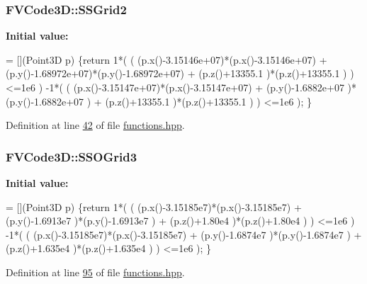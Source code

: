 \subsubsection[{\texorpdfstring{S\+S\+Grid2}{SSGrid2}}]{ F\+V\+Code3\+D\+::\+S\+S\+Grid2}\hypertarget{namespaceFVCode3D_a4072861e3dbbfcd9e80417b32c6991be}{}\label{namespaceFVCode3D_a4072861e3dbbfcd9e80417b32c6991be}
{\bfseries Initial value\+:}
\begin{DoxyCode}
= [](Point3D p)
    \{\textcolor{keywordflow}{return}  1*( (
                   (p.x()-3.15146e+07)*(p.x()-3.15146e+07) +
                   (p.y()-1.68972e+07)*(p.y()-1.68972e+07) +
                   (p.z()+13355.1    )*(p.z()+13355.1    )
                 ) <=1e6
               )
            -1*( (
                   (p.x()-3.15147e+07)*(p.x()-3.15147e+07) +
                   (p.y()-1.6882e+07 )*(p.y()-1.6882e+07 ) +
                   (p.z()+13355.1    )*(p.z()+13355.1    )
                 ) <=1e6
               );
    \}
\end{DoxyCode}


Definition at line \hyperlink{functions_8hpp_source_l00042}{42} of file \hyperlink{functions_8hpp_source}{functions.\+hpp}.

\subsubsection[{\texorpdfstring{S\+S\+O\+Grid3}{SSOGrid3}}]{ F\+V\+Code3\+D\+::\+S\+S\+O\+Grid3}\hypertarget{namespaceFVCode3D_ad684cb0cef80af1bba8db353619ab1cf}{}\label{namespaceFVCode3D_ad684cb0cef80af1bba8db353619ab1cf}
{\bfseries Initial value\+:}
\begin{DoxyCode}
= [](Point3D p)
    \{\textcolor{keywordflow}{return} 1*( (
                    (p.x()-3.15185e7)*(p.x()-3.15185e7) +
                    (p.y()-1.6913e7 )*(p.y()-1.6913e7 ) +
                    (p.z()+1.80e4   )*(p.z()+1.80e4   )
                 ) <=1e6
               )
            -1*( (
                    (p.x()-3.15185e7)*(p.x()-3.15185e7) +
                    (p.y()-1.6874e7 )*(p.y()-1.6874e7 ) +
                    (p.z()+1.635e4  )*(p.z()+1.635e4  )
                 ) <=1e6
               );
    \}
\end{DoxyCode}


Definition at line \hyperlink{functions_8hpp_source_l00095}{95} of file \hyperlink{functions_8hpp_source}{functions.\+hpp}.


